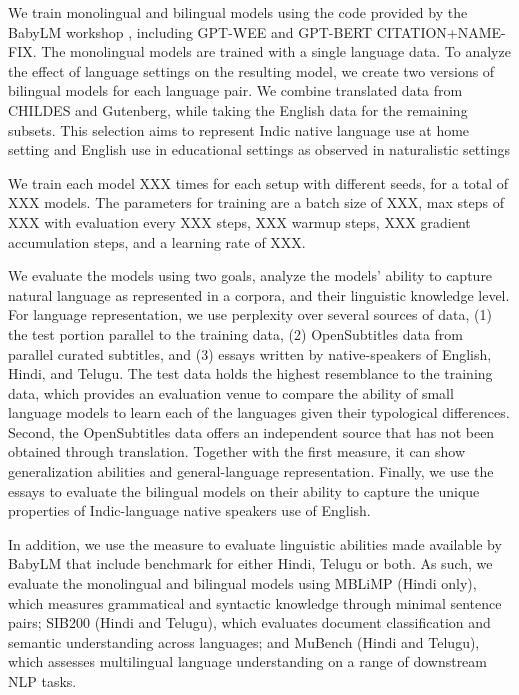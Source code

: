 \documentclass[11pt]{article}
\begin{document}
We train monolingual and bilingual models using the code provided by the BabyLM workshop \cite{choshen2026babylm}, including GPT-WEE and GPT-BERT CITATION+NAME-FIX. The monolingual models are trained with a single language data. To analyze the effect of language settings on the resulting model, we create two versions of bilingual models for each language pair. We combine translated data from CHILDES and Gutenberg, while taking the English data for the remaining subsets. This selection aims to represent Indic native language use at home setting and English use in educational settings as observed in naturalistic settings \cite{mohanty2006multilingualism}

We train each model XXX times
for each setup with different seeds, for a total of
XXX models. The parameters for training are a batch
size of XXX, max steps of XXX with evaluation
every XXX steps, XXX warmup steps, XXX gradient
accumulation steps, and a learning rate of XXX.

We evaluate the models using two goals, analyze the models' ability to capture natural language as represented in a corpora, and their linguistic knowledge level. For language representation, we use perplexity over several sources of data, (1) the test portion parallel to the training data, (2) OpenSubtitles data from parallel curated subtitles, and (3) essays written by native-speakers of English, Hindi, and Telugu. The test data holds the highest resemblance to the training data, which provides an evaluation venue to compare the ability of small language models to learn each of the languages given their typological differences. Second, the OpenSubtitles data offers an independent source that has not been obtained through translation. Together with the first measure, it can show generalization abilities and general-language representation. 
Finally, we use the essays to evaluate the bilingual models on their ability to capture the unique properties of Indic-language native speakers use of English.

In addition, we use the measure to evaluate linguistic abilities made available by BabyLM that include benchmark for either Hindi, Telugu or both. As such, we evaluate the monolingual and bilingual models using MBLiMP (Hindi only), which measures grammatical and syntactic knowledge through minimal sentence pairs; SIB200 (Hindi and Telugu), which evaluates document classification and semantic understanding across languages; and MuBench (Hindi and Telugu), which assesses multilingual language understanding on a range of downstream NLP tasks.
\end{document}
